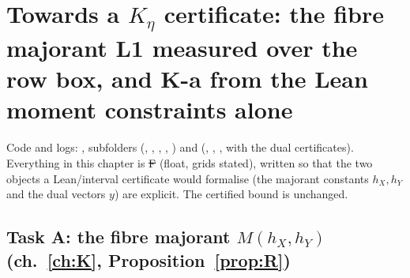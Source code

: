 \section{Towards a $K_\eta$ certificate: the fibre majorant L1 measured over the row box, and K-a from the Lean moment constraints alone}\label{ch:certs}

Code and logs: , subfolders  (, , , ,
) and  (, , ,  with the dual certificates). Everything in this chapter is \st{F}
(float, grids stated), written so that the two objects a Lean/interval certificate would formalise (the majorant constants $h_X,h_Y$ and the dual vectors $y$) are explicit. The certified bound is
unchanged.

\subsection{Task A: the fibre majorant $M(h_X,h_Y)$ (ch.~\autoref{ch:K}, Proposition~\ref{prop:R})}\label{sec:certs-L1}
